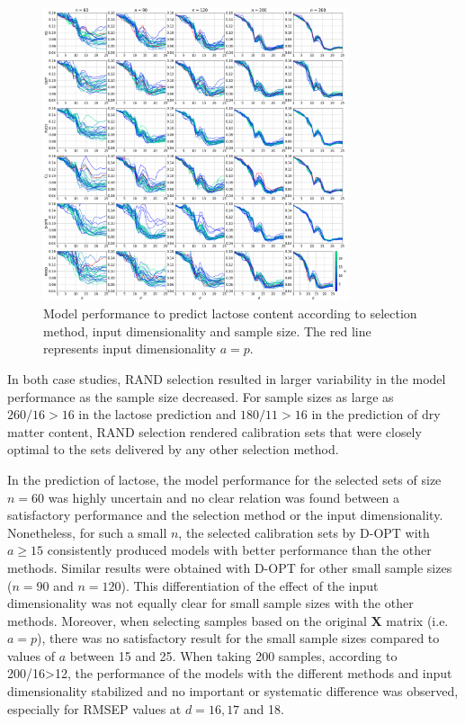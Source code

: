 \documentclass[journal=ancham,manuscript=article]{achemso}
\begin{document}
\begin{figure}[b]
\includegraphics[width=0.8\textwidth]{manuscript/figures/d01_milk_model_performance.png}
\centering
\caption{Model performance to predict lactose content according to selection method, input dimensionality and sample size. The red line represents input dimensionality $a=p$.}
\label{fig_d01_milk_model_performance}
\end{figure}

In both case studies, RAND selection resulted in larger variability in the model performance as the sample size decreased. For sample sizes as large as $260/16 > 16$ in the lactose prediction and $180/11 > 16$ in the prediction of dry matter content, RAND selection rendered calibration sets that were closely optimal to the sets delivered by any other selection method. 

In the prediction of lactose, the model performance for the selected sets of size $n=60$ was highly uncertain and no clear relation was found between a satisfactory performance and the selection method or the input dimensionality. Nonetheless, for such a small $n$, the selected calibration sets by D-OPT with $a \ge 15$ consistently produced models with better performance than the other methods. Similar results were obtained with D-OPT for other small sample sizes ($n=90$ and $n=120$). This differentiation of the effect of the input dimensionality was not equally clear for small sample sizes with the other methods. Moreover, when selecting samples based on the original $\mathbf{X}$ matrix (i.e. $a=p$), there was no satisfactory result for the small sample sizes compared to values of $a$ between 15 and 25. When taking 200 samples, according to 200/16>12, the performance of the models with the different methods and input dimensionality stabilized and no important or systematic difference was observed, especially for RMSEP values at $d=16, 17$ and 18.
\end{document}
